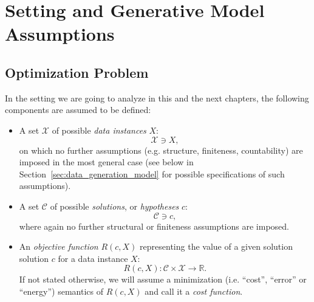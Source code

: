 

\section{Setting and Generative Model Assumptions}
\label{sec:gen_appch_setting_and_model}

\subsection{Optimization Problem}
\label{sec:optimization_problem_description}

In the setting we are going to analyze in this and the next chapters, the
following components are assumed to be defined: 

\begin{itemize}
  \item A set $\mathcal{X}$ of possible \textit{data instances} $X$:
  \begin{equation}
    \mathcal{X} \ni X,
  \end{equation}
  on which no further assumptions (e.g. structure, finiteness, countability) are
  imposed in the most general case (see below in
  Section~\ref{sec:data_generation_model} for possible specifications of such
  assumptions).

  \item A set $\mathcal{C}$ of possible \textit{solutions}, or
  \textit{hypotheses} $c$:
  \begin{equation}
    \mathcal{C} \ni c,
  \end{equation}
  where again no further structural or finiteness assumptions are imposed.

  \item An \textit{objective function} $R(c, X)$ representing the value of a
  given solution solution $c$ for a data instance $X$:
  \begin{equation}\label{eq:cost_function}
    R(c, X) \colon \mathcal{C} \times \mathcal{X} \to \mathbb{R}.
  \end{equation}
  If not stated otherwise, we will assume a minimization (i.e. ``cost'', ``error''
  or ``energy'') semantics of $R(c,X)$ and call it a \textit{cost function}.
\end{itemize}

